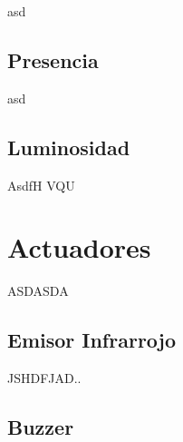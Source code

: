 asd

\subsection{Presencia}
\label{diseno:sec:presencia}

asd

\subsection{Luminosidad}
\label{diseno:sec:presencia}

AsdfH VQU

\section{Actuadores}
\label{diseno:sec:actuadores}

ASDASDA

\subsection{Emisor Infrarrojo}
\label{diseno:sec:ir}

JSHDFJAD..

\subsection{Buzzer}
\label{diseno:sec:buzzer}


